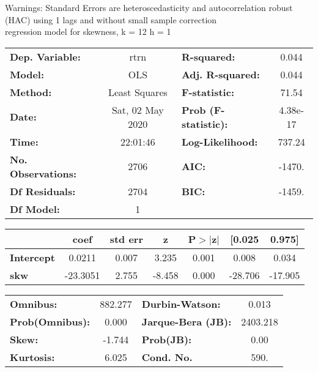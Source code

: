 Warnings: \newline
 [1] Standard Errors are heteroscedasticity and autocorrelation robust (HAC) using 1 lags and without small sample correction\\ 

regression model for skewness, k = 12 h = 1\begin{center}
\begin{tabular}{lclc}
\toprule
\textbf{Dep. Variable:}    &       rtrn       & \textbf{  R-squared:         } &     0.044   \\
\textbf{Model:}            &       OLS        & \textbf{  Adj. R-squared:    } &     0.044   \\
\textbf{Method:}           &  Least Squares   & \textbf{  F-statistic:       } &     71.54   \\
\textbf{Date:}             & Sat, 02 May 2020 & \textbf{  Prob (F-statistic):} &  4.38e-17   \\
\textbf{Time:}             &     22:01:46     & \textbf{  Log-Likelihood:    } &    737.24   \\
\textbf{No. Observations:} &        2706      & \textbf{  AIC:               } &    -1470.   \\
\textbf{Df Residuals:}     &        2704      & \textbf{  BIC:               } &    -1459.   \\
\textbf{Df Model:}         &           1      & \textbf{                     } &             \\
\bottomrule
\end{tabular}
\begin{tabular}{lcccccc}
                   & \textbf{coef} & \textbf{std err} & \textbf{z} & \textbf{P$> |$z$|$} & \textbf{[0.025} & \textbf{0.975]}  \\
\midrule
\textbf{Intercept} &       0.0211  &        0.007     &     3.235  &         0.001        &        0.008    &        0.034     \\
\textbf{skw}       &     -23.3051  &        2.755     &    -8.458  &         0.000        &      -28.706    &      -17.905     \\
\bottomrule
\end{tabular}
\begin{tabular}{lclc}
\textbf{Omnibus:}       & 882.277 & \textbf{  Durbin-Watson:     } &    0.013  \\
\textbf{Prob(Omnibus):} &   0.000 & \textbf{  Jarque-Bera (JB):  } & 2403.218  \\
\textbf{Skew:}          &  -1.744 & \textbf{  Prob(JB):          } &     0.00  \\
\textbf{Kurtosis:}      &   6.025 & \textbf{  Cond. No.          } &     590.  \\
\bottomrule
\end{tabular}
\end{center}

